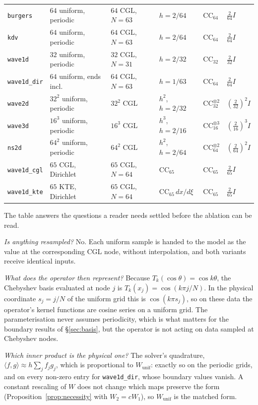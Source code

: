 \documentclass[11pt]{article}
\theoremstyle{definition}
\theoremstyle{remark}
\newcommand{\iprod}[2]{\langle #1, #2 \rangle}
\newcommand{\Wu}{W_{\mathrm{unif}}}
\begin{document}
\begin{table}[htbp]
\begin{tabular}{@{}llllll@{}}
\texttt{burgers}    & $64$ uniform, periodic & $64$ CGL, $N=63$ & $h=2/64$ & $\mathrm{CC}_{64}$ & $\tfrac{2}{64}I$ \\
\texttt{kdv}        & $64$ uniform, periodic & $64$ CGL, $N=63$ & $h=2/64$ & $\mathrm{CC}_{64}$ & $\tfrac{2}{64}I$ \\
\texttt{wave1d}     & $32$ uniform, periodic & $32$ CGL, $N=31$ & $h=2/32$ & $\mathrm{CC}_{32}$ & $\tfrac{2}{32}I$ \\
\texttt{wave1d\_dir}& $64$ uniform, ends incl. & $64$ CGL, $N=63$ & $h=1/63$ & $\mathrm{CC}_{64}$ & $\tfrac{2}{64}I$ \\
\texttt{wave2d}     & $32^2$ uniform, periodic & $32^2$ CGL & $h^2$, $h=2/32$ & $\mathrm{CC}_{32}^{\otimes2}$ & $(\tfrac{2}{32})^2I$ \\
\texttt{wave3d}     & $16^3$ uniform, periodic & $16^3$ CGL & $h^3$, $h=2/16$ & $\mathrm{CC}_{16}^{\otimes3}$ & $(\tfrac{2}{16})^3I$ \\
\texttt{ns2d}       & $64^2$ uniform, periodic & $64^2$ CGL & $h^2$, $h=2/64$ & $\mathrm{CC}_{64}^{\otimes2}$ & $(\tfrac{2}{64})^2I$ \\
\texttt{wave1d\_cgl}& $65$ CGL, Dirichlet & $65$ CGL, $N=64$ & $\mathrm{CC}_{65}$ & $\mathrm{CC}_{65}$ & $\tfrac{2}{65}I$ \\
\texttt{wave1d\_kte}& $65$ KTE, Dirichlet & $65$ CGL, $N=64$ & $\mathrm{CC}_{65}\,dx/d\xi$ & $\mathrm{CC}_{65}$ & $\tfrac{2}{65}I$ \\
\bottomrule
\end{tabular}
\end{table}

The table answers the questions a reader needs settled before the ablation can
be read.

\emph{Is anything resampled?} No. Each uniform sample is handed to the model as
the value at the corresponding CGL node, without interpolation, and both
variants receive identical inputs.

\emph{What does the operator then represent?} Because
$T_k(\cos\theta)=\cos k\theta$, the Chebyshev basis evaluated at node $j$ is
$T_k(x_j)=\cos(k\pi j/N)$. In the physical coordinate $s_j=j/N$ of the uniform
grid this is $\cos(k\pi s_j)$, so on these data the operator's kernel functions
are cosine series on a uniform grid. The parameterisation never assumes
periodicity, which is what matters for the boundary results of
\S\ref{sec:basis}, but the operator is not acting on data sampled at Chebyshev
nodes.

\emph{Which inner product is the physical one?} The solver's quadrature,
$\iprod{f}{g}\approx h\sum_jf_jg_j$, which is proportional to $\Wu$: exactly so
on the periodic grids, and on every non-zero entry for \texttt{wave1d\_dir},
whose boundary values vanish. A constant rescaling of $W$ does not change which
maps preserve the form (Proposition~\ref{prop:necessity} with $W_2=cW_1$), so
$\Wu$ is the matched form.
\end{document}
